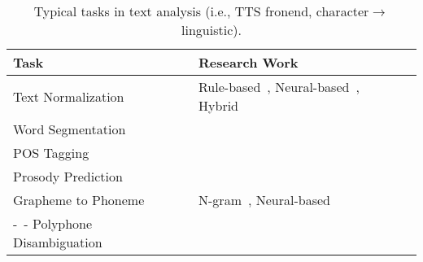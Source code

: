 \documentclass{article}
\begin{document}
\begin{table}[h!]
\small
	\caption{Typical tasks in text analysis (i.e., TTS fronend, character$\rightarrow$linguistic).}
	\centering
	\begin{tabular}{ l  l }
		\toprule
		Task & Research Work   \\
		\midrule
		Text Normalization & Rule-based~\cite{sproat2001normalization}, Neural-based~\cite{sproat2016rnn,mansfield2019neural,yolchuyeva2018text,zhang2019neural}, Hybrid~\cite{zhang2020hybrid} \\
		Word Segmentation & \cite{xue2003chinese,zheng2013deep,pei2014max} \\
		POS Tagging & \cite{schlunz2010effects,sun2011improved,mamateli2011morphological,zheng2013deep,janicki2004application} \\
		Prosody Prediction &  \cite{chu2001locating,ying2001rnn,sridhar2007exploiting,levow2008automatic,jeon2009automatic,sun2009chinese,qian2010automatic,ding2015automatic,zhang2016mandarin,lu2019self,lu2019implementing,ai2020neural} \\
		Grapheme to Phoneme & N-gram~\cite{chen2003conditional,bisani2008joint}, Neural-based~\cite{yao2015sequence,rao2015grapheme,chae2018convolutional,sun2019token} \\
		-~- Polyphone Disambiguation & \cite{zhang2002efficient,xu2004grapheme,mao2007inequality,shan2016bi,sun2019knowledge,cai2019polyphone,park2020g2pm}   \\
		\bottomrule
	\end{tabular}
	\vspace{0.3cm}
	\label{tab_text_analysis_works}
\end{table}
\end{document}
